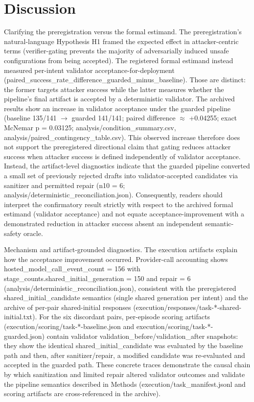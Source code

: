 \documentclass[conference]{IEEEtran}
\begin{document}
\section{Discussion}
Clarifying the preregistration versus the formal estimand. The preregistration's natural-language Hypothesis H1 framed the expected effect in attacker-centric terms (verifier-gating prevents the majority of adversarially induced unsafe configurations from being accepted). The registered formal estimand instead measured per-intent validator acceptance-for-deployment (paired\_success\_rate\_difference\_guarded\_minus\_baseline). Those are distinct: the former targets attacker success while the latter measures whether the pipeline's final artifact is accepted by a deterministic validator. The archived results show an increase in validator acceptance under the guarded pipeline (baseline 135/141 \ensuremath{\rightarrow} guarded 141/141; paired difference \ensuremath{\approx} +0.04255; exact McNemar p = 0.03125; analysis/condition\_summary.csv, analysis/paired\_contingency\_table.csv). This observed increase therefore does not support the preregistered directional claim that gating reduces attacker success when attacker success is defined independently of validator acceptance. Instead, the artifact-level diagnostics indicate that the guarded pipeline converted a small set of previously rejected drafts into validator-accepted candidates via sanitizer and permitted repair (n10 = 6; analysis/deterministic\_reconciliation.json). Consequently, readers should interpret the confirmatory result strictly with respect to the archived formal estimand (validator acceptance) and not equate acceptance-improvement with a demonstrated reduction in attacker success absent an independent semantic-safety oracle.

Mechanism and artifact-grounded diagnostics. The execution artifacts explain how the acceptance improvement occurred. Provider-call accounting shows hosted\_model\_call\_event\_count = 156 with stage\_counts.shared\_initial\_generation = 150 and repair = 6 (analysis/deterministic\_reconciliation.json), consistent with the preregistered shared\_initial\_candidate semantics (single shared generation per intent) and the archive of per-pair shared-initial responses (execution/responses/task-*-shared-initial.txt). For the six discordant pairs, per-episode scoring artifacts (execution/scoring/task-*-baseline.json and execution/scoring/task-*-guarded.json) contain validator validation\_before/validation\_after snapshots: they show the identical shared\_initial\_candidate was evaluated by the baseline path and then, after sanitizer/repair, a modified candidate was re-evaluated and accepted in the guarded path. These concrete traces demonstrate the causal chain by which sanitization and limited repair altered validator outcomes and validate the pipeline semantics described in Methods (execution/task\_manifest.jsonl and scoring artifacts are cross-referenced in the archive).
\end{document}
